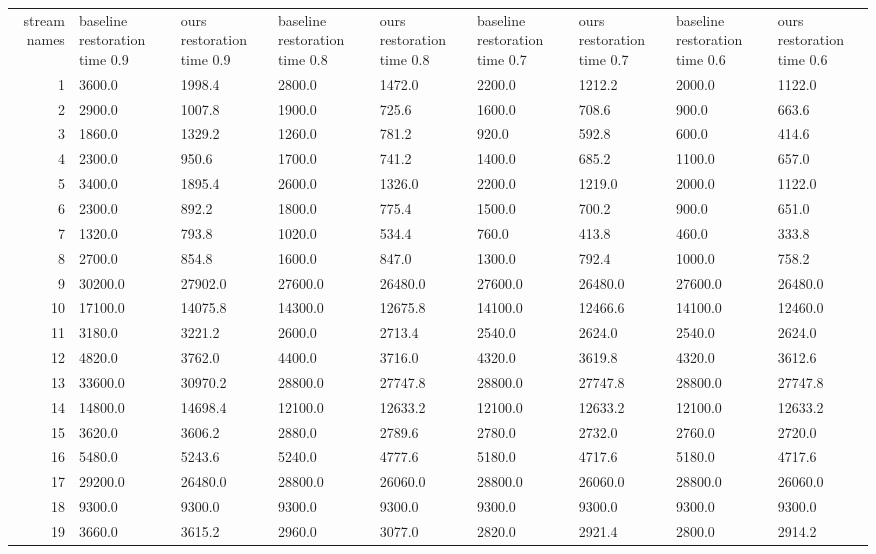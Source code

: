 \begin{tabular}{|r|l|l|l|l|l|l|l|l|}
  \hline
  stream names & baseline restoration time 0.9 & ours restoration time 0.9 & baseline restoration time 0.8 & ours restoration time 0.8 & baseline restoration time 0.7 & ours restoration time 0.7 & baseline restoration time 0.6 & ours restoration time 0.6 \\ 
  1 & 3600.0 & 1998.4 & 2800.0 & 1472.0 & 2200.0 & 1212.2 & 2000.0 & 1122.0 \\ 
  2 & 2900.0 & 1007.8 & 1900.0 & 725.6 & 1600.0 & 708.6 & 900.0 & 663.6 \\ 
  3 & 1860.0 & 1329.2 & 1260.0 & 781.2 & 920.0 & 592.8 & 600.0 & 414.6 \\ 
  4 & 2300.0 & 950.6 & 1700.0 & 741.2 & 1400.0 & 685.2 & 1100.0 & 657.0 \\ 
  5 & 3400.0 & 1895.4 & 2600.0 & 1326.0 & 2200.0 & 1219.0 & 2000.0 & 1122.0 \\ 
  6 & 2300.0 & 892.2 & 1800.0 & 775.4 & 1500.0 & 700.2 & 900.0 & 651.0 \\ 
  7 & 1320.0 & 793.8 & 1020.0 & 534.4 & 760.0 & 413.8 & 460.0 & 333.8 \\ 
  8 & 2700.0 & 854.8 & 1600.0 & 847.0 & 1300.0 & 792.4 & 1000.0 & 758.2 \\ 
  9 & 30200.0 & 27902.0 & 27600.0 & 26480.0 & 27600.0 & 26480.0 & 27600.0 & 26480.0 \\ 
  10 & 17100.0 & 14075.8 & 14300.0 & 12675.8 & 14100.0 & 12466.6 & 14100.0 & 12460.0 \\ 
  11 & 3180.0 & 3221.2 & 2600.0 & 2713.4 & 2540.0 & 2624.0 & 2540.0 & 2624.0 \\ 
  12 & 4820.0 & 3762.0 & 4400.0 & 3716.0 & 4320.0 & 3619.8 & 4320.0 & 3612.6 \\ 
  13 & 33600.0 & 30970.2 & 28800.0 & 27747.8 & 28800.0 & 27747.8 & 28800.0 & 27747.8 \\ 
  14 & 14800.0 & 14698.4 & 12100.0 & 12633.2 & 12100.0 & 12633.2 & 12100.0 & 12633.2 \\ 
  15 & 3620.0 & 3606.2 & 2880.0 & 2789.6 & 2780.0 & 2732.0 & 2760.0 & 2720.0 \\ 
  16 & 5480.0 & 5243.6 & 5240.0 & 4777.6 & 5180.0 & 4717.6 & 5180.0 & 4717.6 \\ 
  17 & 29200.0 & 26480.0 & 28800.0 & 26060.0 & 28800.0 & 26060.0 & 28800.0 & 26060.0 \\ 
  18 & 9300.0 & 9300.0 & 9300.0 & 9300.0 & 9300.0 & 9300.0 & 9300.0 & 9300.0 \\ 
  19 & 3660.0 & 3615.2 & 2960.0 & 3077.0 & 2820.0 & 2921.4 & 2800.0 & 2914.2 \\ 

\end{tabular}
